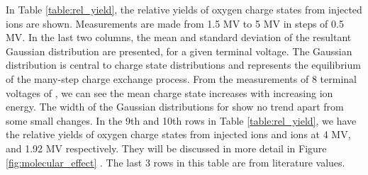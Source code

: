 \documentclass[a4paper,fleqn,review]{cas-sc}
\begin{document}
In Table \ref{table:rel_yield}, the relative yields of oxygen charge states from injected  ions are shown. Measurements are made from 1.5 MV to 5 MV in steps of 0.5 MV. In the last two columns, the mean and standard deviation of the resultant Gaussian distribution are presented, for a given terminal voltage. The Gaussian distribution is central to charge state distributions and represents the equilibrium of the many-step charge exchange process. From the measurements of 8 terminal voltages of , we can see the mean charge state increases with increasing ion energy. The width of the Gaussian distributions for  show no trend apart from some small changes. In the 9th and 10th rows in Table \ref{table:rel_yield}, we have the relative yields of oxygen charge states from injected  ions and  ions at 4 MV, and 1.92 MV respectively. They will be discussed in more detail in Figure \ref{fig:molecular_effect} . The last 3 rows in this table are from literature values. 
\end{document}

